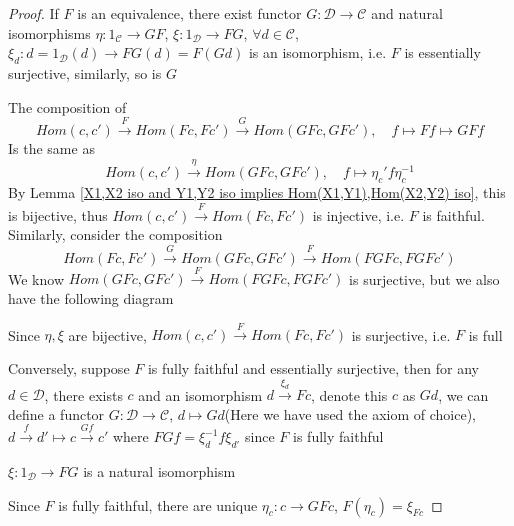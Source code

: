 \documentclass[../main.tex]{subfiles}
\begin{document}
\begin{proof}
If $F$ is an equivalence, there exist functor $G:\mathscr D\to \mathscr C$ and natural isomorphisms $\eta:1_{\mathscr C}\to GF$,  $\xi:1_{\mathscr D}\to FG$, $\forall d\in\mathscr C$, $\xi_d:d=1_{\mathscr D}(d)\to FG(d)=F(Gd)$ is an isomorphism, i.e. $F$ is essentially surjective, similarly, so is $G$ \par
The composition of 
\[Hom(c,c')\xrightarrow{F} Hom(Fc,Fc')\xrightarrow{G} Hom(GFc,GFc'),\quad f\mapsto Ff\mapsto GFf\]
Is the same as
\[Hom(c,c')\xrightarrow{\eta} Hom(GFc,GFc'),\quad f\mapsto\eta_{c}'f\eta_c^{-1}\]
By Lemma \ref{X1,X2 iso and Y1,Y2 iso implies Hom(X1,Y1),Hom(X2,Y2) iso}, this is bijective, thus $Hom(c,c')\xrightarrow{F} Hom(Fc,Fc')$ is injective, i.e. $F$ is faithful. Similarly, consider the composition
\[Hom(Fc,Fc')\xrightarrow{G} Hom(GFc,GFc')\xrightarrow{F} Hom(FGFc,FGFc')\]
We know $Hom(GFc,GFc')\xrightarrow{F} Hom(FGFc,FGFc')$ is surjective, but we also have the following diagram
\begin{center}
\end{center}
Since $\eta,\xi$ are bijective, $Hom(c,c')\xrightarrow{F} Hom(Fc,Fc')$ is surjective, i.e. $F$ is full \par
Conversely, suppose $F$ is fully faithful and essentially surjective, then for any $d\in\mathscr D$, there exists $c$ and an isomorphism $d\xrightarrow{\xi_d} Fc$, denote this $c$ as $Gd$, we can define a functor $G:\mathscr D\to\mathscr C$, $d\mapsto Gd$(Here we have used the axiom of choice), $d\xrightarrow{f}d'\mapsto c\xrightarrow{Gf}c'$ where $FGf=\xi_d^{-1}f\xi_{d'}$ since $F$ is fully faithful
\begin{center}
\end{center}
$\xi:1_{\mathscr D}\to FG$ is a natural isomorphism \par
Since $F$ is fully faithful, there are unique $\eta_c:c\to GFc$, $F(\eta_c)=\xi_{Fc}$ \par

\end{proof}
\end{document}
